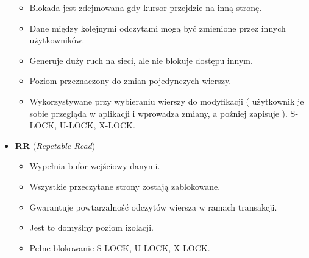 \documentclass[a4paper,twoside]{article}
\begin{document}
\begin{itemize}
\begin{itemize}
              \item Blokada jest zdejmowana gdy kursor przejdzie na inną stronę.
              \item Dane między kolejnymi odczytami mogą być zmienione przez innych użytkowników.             \item Generuje duży ruch na sieci, ale nie blokuje dostępu innym.
              \item Poziom przeznaczony do zmian pojedynczych wierszy.
              \item Wykorzystywane przy wybieraniu wierszy do modyfikacji ( użytkownik je sobie przegląda w aplikacji i wprowadza zmiany, a poźniej zapisuje ). S-LOCK, U-LOCK, X-LOCK.
          \end{itemize}
          \item \textbf{RR} (\emph{Repetable Read})
          \begin{itemize}
              \item Wypełnia bufor wejściowy danymi.
              \item Wszystkie przeczytane strony zostają zablokowane.
              \item Gwarantuje powtarzalność odczytów wiersza w ramach transakcji.
              \item Jest to domyślny poziom izolacji.
              \item Pełne blokowanie S-LOCK, U-LOCK, X-LOCK.
          \end{itemize}
      \end{itemize}


\end{document}
